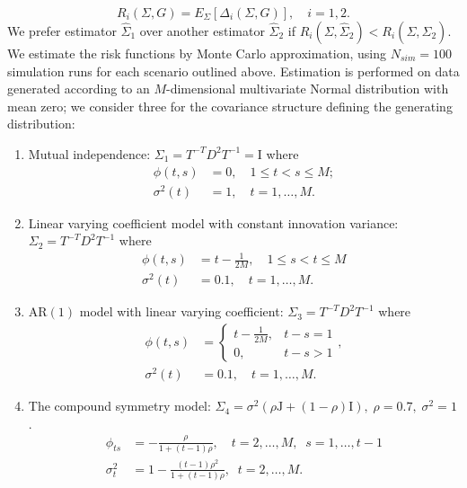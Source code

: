 \documentclass[12pt]{article}
\theoremstyle{definition}
\begin{document}
\begin{equation*}
R_i \left(\Sigma, G\right) = E_\Sigma\left[\Delta_i\left(\Sigma,G\right)\right], \quad i = 1,2.
\end{equation*}
\noindent
We prefer estimator $\hat{\Sigma}_1$ over another estimator $\hat{\Sigma}_2$ if $R_i \left(\Sigma, \hat{\Sigma}_2\right) < R_i \left(\Sigma, \hat{\Sigma}_2\right)$. We estimate the risk functions by Monte Carlo approximation, using $N_{sim} = 100$ simulation runs for each scenario outlined above.  Estimation is performed on data generated according to an $M$-dimensional multivariate Normal distribution with mean zero; we consider three for the covariance structure defining the generating distribution:

\begin{enumerate} 
\item Mutual independence: $\Sigma_1 = T^{-T} D^2 T^{-1} = \mathrm{I}$ where 
\begin{align*}
\phi\left(t,s\right) &= 0, \quad 1 \le t < s \le M;\\ 
\sigma^2\left(t\right) &= 1, \quad t = 1,\dots, M.
\end{align*}
\item Linear varying coefficient model with constant innovation variance: $\Sigma_2 = T^{-T} D^2 T^{-1}$ where 
\begin{align*}
\phi\left(t,s\right) &= t - \frac{1}{2M}, \quad 1 \le s < t \le M \\
\sigma^2\left(t\right) &= 0.1, \quad t = 1,\dots, M.
\end{align*}
\item $\mbox{AR}\left(1\right)$ model with linear varying coefficient: $\Sigma_3 = T^{-T} D^2 T^{-1}$ where 
\begin{align*}
\phi\left(t,s\right) &= \left\{\begin{array}{ll} t - \frac{1}{2M}, & t - s = 1\\ 0, & t - s > 1\end{array}\right.,\\
\sigma^2\left(t\right) &= 0.1, \quad t = 1,\dots, M.
\end{align*}
\item The compound symmetry model: $\Sigma_4 = \sigma^2\left(\rho \mathrm{J} + \left(1-\rho\right)\mathrm{I}\right),\; \rho=0.7,\;\sigma^2=1$. 
\begin{align*}
\phi_{ts} &= -\frac{\rho}{1 + \left(t-1\right)\rho}, \quad t = 2, \dots, M,\;\; s = 1, \dots, t-1\\
\sigma_t^2 &= 1 -\frac{\left(t-1\right)\rho^2}{1 + \left(t-1\right)\rho}, \;\; t = 2, \dots, M.
\end{align*}
\end{enumerate}
\end{document}
